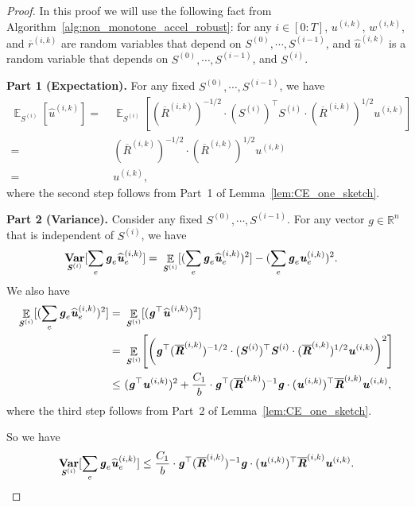 \documentclass[11pt]{article}
\let\originalleft\left
\let\originalright\right
\renewcommand{\left}{\mathopen{}\mathclose\bgroup\originalleft}
\renewcommand{\right}{\aftergroup\egroup\originalright}
\renewcommand\gg{\boldsymbol{\mathit{g}}}
\newcommand\uu{\boldsymbol{\mathit{u}}}
\newcommand\ww{\boldsymbol{\mathit{w}}}
\newcommand\rrbar{\overline{\boldsymbol{\mathit{r}}}}
\renewcommand\SS{\boldsymbol{\mathit{S}}}
\newcommand\RRbar{\boldsymbol{\overline{\mathit{R}}}}
\newcommand{\wh}{\widehat}
\newcommand\R{\mathbb{R}}
\DeclareMathOperator*{\E}{{\mathbb{E}}}
\DeclareMathOperator*{\Var}{{\bf {Var}}}
\begin{document}
\begin{proof}
In this proof we will use the following fact from Algorithm~\ref{alg:non_monotone_accel_robust}: for any $i \in [0:T]$, $\uu^{(i,k)}$, $\ww^{(i,k)}$, and $\rrbar^{(i,k)}$ are random variables that depend on $\SS^{(0)}, \cdots, \SS^{(i-1)}$, and $\wh{\uu}^{(i,k)}$ is a random variable that depends on $\SS^{(0)}, \cdots, \SS^{(i-1)}$, and $\SS^{(i)}$.

{\bf Part 1 (Expectation).} For any fixed $\SS^{(0)}, \cdots, \SS^{(i-1)}$, we have
\begin{align*}
\E_{\SS^{(i)}}[\wh{\uu}^{(i,k)}] = &~ \E_{\SS^{(i)}}[(\RRbar^{(i,k)})^{-1/2} \cdot (\SS^{(i)})^{\top} \SS^{(i)} \cdot (\RRbar^{(i,k)})^{1/2} \uu^{(i,k)}] \\
= &~ (\RRbar^{(i,k)})^{-1/2} \cdot (\RRbar^{(i,k)})^{1/2} \uu^{(i,k)} \\
= &~ \uu^{(i,k)},
\end{align*}
where the second step follows from Part~1 of Lemma~\ref{lem:CE_one_sketch}.


{\bf Part 2 (Variance).} Consider any fixed $\SS^{(0)}, \cdots, \SS^{(i-1)}$. For any vector $\gg \in \R^n$ that is independent of $\SS^{(i)}$, we have
\begin{align*}
\Var_{\SS^{(i)}}[\sum_e \gg_e \wh{\uu}^{(i,k)}_e] = &~ \E_{\SS^{(i)}}[(\sum_e \gg_e \wh{\uu}^{(i,k)}_e)^2] - (\sum_e \gg_e \uu^{(i,k)}_e)^2.
\end{align*}
We also have 
\begin{align*}
\E_{\SS^{(i)}}[(\sum_e \gg_e \wh{\uu}^{(i,k)}_e)^2] = &~ \E_{\SS^{(i)}}[(\gg^{\top} \wh{\uu}^{(i,k)})^2] \\
= &~ \E_{\SS^{(i)}}\left[\left(\gg^{\top} (\RRbar^{(i,k)})^{-1/2} \cdot (\SS^{(i)})^{\top} \SS^{(i)} \cdot (\RRbar^{(i,k)})^{1/2} \uu^{(i,k)}\right)^2\right] \\
\leq &~ (\gg^{\top} \uu^{(i,k)})^2 + \frac{C_1}{b} \cdot \gg^{\top} (\RRbar^{(i,k)})^{-1} \gg \cdot (\uu^{(i,k)})^{\top} \RRbar^{(i,k)} \uu^{(i,k)},
\end{align*}
where the third step follows from Part~2 of Lemma~\ref{lem:CE_one_sketch}.

So we have
\begin{align*}
\Var_{\SS^{(i)}}[\sum_e \gg_e \wh{\uu}^{(i,k)}_e] \leq \frac{C_1}{b} \cdot \gg^{\top} (\RRbar^{(i,k)})^{-1} \gg \cdot (\uu^{(i,k)})^{\top} \RRbar^{(i,k)} \uu^{(i,k)}.
\end{align*}


\end{proof}
\end{document}
